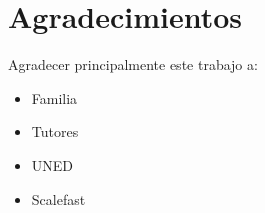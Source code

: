 \chapter*{Agradecimientos}

\setcounter{page}{7}
	
Agradecer principalmente este trabajo a:

\begin{itemize}
  \item{Familia}
  \item{Tutores}
  \item{UNED}
  \item{Scalefast}
\end{itemize}

		
	\vfill
	
	\newpage %
	\thispagestyle{empty}
	\mbox{}
	


